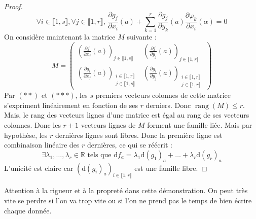 \begin{proof}
		\[ \forall i \in \llbracket 1, s \rrbracket, \forall j \in \llbracket 1, r \rrbracket, \, \frac{\partial g_j}{\partial x_i}(a) + \sum_{k=1}^r \frac{\partial g_j}{\partial y_k}(a) \frac{\partial \varphi_k}{\partial x_i}(\alpha) = 0 \tag{$***$} \]
		On considère maintenant la matrice $M$ suivante :
		\[ M = \begin{pmatrix}
			\left( \frac{\partial f}{\partial x_j}(a) \right)_{j \in \llbracket 1, s \rrbracket} & \left( \frac{\partial f}{\partial y_j}(a) \right)_{j \in \llbracket 1, r \rrbracket} \\
			\left( \frac{\partial g_i}{\partial x_j}(a) \right)_{\substack{i \in \llbracket 1, r \rrbracket \\ j \in \llbracket 1, s \rrbracket}} & \left( \frac{\partial g_i}{\partial y_j}(a) \right)_{\substack{i \in \llbracket 1, r \rrbracket \\ j \in \llbracket 1, r \rrbracket}}
		\end{pmatrix} \]
		Par $(**)$ et $(***)$, les $s$ premiers vecteurs colonnes de cette matrice s'expriment linéairement en fonction de ses $r$ derniers. Donc $\operatorname{rang}(M) \leq r$. Mais, le rang des vecteurs lignes d'une matrice est égal au rang de ses vecteurs colonnes. Donc les $r+1$ vecteurs lignes de $M$ forment une famille liée. Mais par hypothèse, les $r$ dernières lignes sont libres. Donc la première ligne est combinaison linéaire des $r$ dernières, ce qui se réécrit :
		\[ \exists \lambda_1, \dots, \lambda_r \in \mathbb{R} \text{ tels que } \mathrm{d}f_a = \lambda_1 \mathrm{d}(g_1)_a + \dots + \lambda_r \mathrm{d}(g_r)_a \]
		L'unicité est claire car $(\mathrm{d}(g_i)_a)_{i \in \llbracket 1, r \rrbracket}$ est une famille libre.
	\end{proof}

	\begin{remark}
		Attention à la rigueur et à la propreté dans cette démonstration. On peut très vite se perdre si l'on va trop vite ou si l'on ne prend pas le temps de bien écrire chaque donnée.
	\end{remark}


